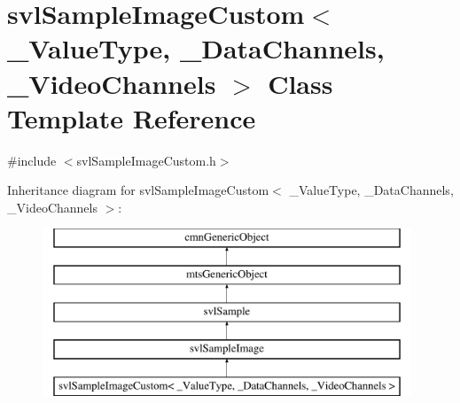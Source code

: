 \hypertarget{classsvl_sample_image_custom}{}\section{svl\+Sample\+Image\+Custom$<$ \+\_\+\+Value\+Type, \+\_\+\+Data\+Channels, \+\_\+\+Video\+Channels $>$ Class Template Reference}
\label{classsvl_sample_image_custom}


{\ttfamily \#include $<$svl\+Sample\+Image\+Custom.\+h$>$}

Inheritance diagram for svl\+Sample\+Image\+Custom$<$ \+\_\+\+Value\+Type, \+\_\+\+Data\+Channels, \+\_\+\+Video\+Channels $>$\+:\begin{figure}[H]
\begin{center}
\leavevmode
\includegraphics[height=5.000000cm]{d9/da7/classsvl_sample_image_custom}
\end{center}
\end{figure}
